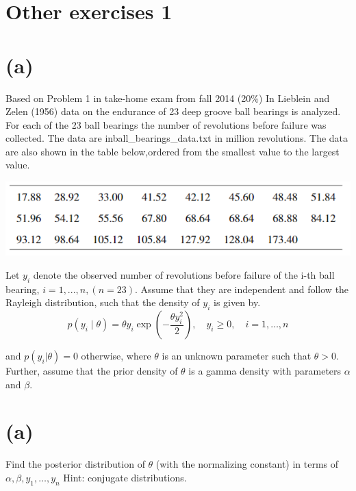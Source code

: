 \documentclass[
  10pt,
]{article}
\author{}
\date{\vspace{-2.5em}}
\begin{document}
\hypertarget{other-exercises-1}{%
\section*{Other exercises 1}\label{other-exercises-1}}

\hypertarget{a}{%
\section*{(a)}\label{a}}

Based on Problem 1 in take-home exam from fall 2014 (20\%) In Lieblein and Zelen (1956) data on the endurance of 23 deep groove ball bearings is analyzed. For each of the 23 ball bearings the number of revolutions before failure was collected. The data are inball\_bearings\_data.txt in million revolutions. The data are also shown in the table below,ordered from the smallest value to the largest value.

\begin{center}\includegraphics[width=0.75\linewidth]{img/tafla} \end{center}

Let \(y_i\) denote the observed number of revolutions before failure of the i-th ball bearing,
\(i= 1,...,n,(n= 23)\). Assume that they are independent and follow the Rayleigh distribution, such that the density of \(y_i\) is given by.
\[p\left(y_{i} \mid \theta\right)=\theta y_{i} \exp \left(-\frac{\theta y_{i}^{2}}{2}\right), \quad y_{i} \geq 0, \quad i=1, \ldots, n\]

and \(p(y_i|\theta) = 0\) otherwise, where \(\theta\) is an unknown parameter such that \(\theta >0\). Further, assume that the prior density of \(\theta\) is a gamma density with parameters \(\alpha\) and \(\beta\).

\hypertarget{a-1}{%
\section*{(a)}\label{a-1}}

Find the posterior distribution of \(\theta\) (with the normalizing constant) in terms of \(\alpha, \beta, y_{1}, \ldots, y_{n}\) Hint:
conjugate distributions.
\end{document}
